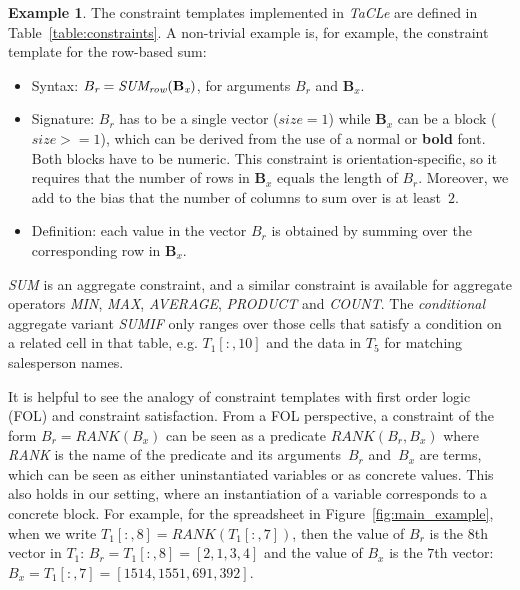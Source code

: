 \documentclass{IEEEtran}
\newcommand{\format}[1]{\textit{#1}\xspace}
\newcommand{\sname}{\format{TaCLe}}
\newcommand{\CName}{Syntax\xspace}
\newcommand{\CSignature}{Signature\xspace}
\newcommand{\CFunction}{Definition\xspace}
\newcommand{\range}[3]{\ensuremath{#1[#2,#3]}}
\newcommand{\rangeall}{:}
\newcommand{\eccalc}[2]{\ensuremath{#1 = #2}}
\newcommand{\ecrank}[2]{\eccalc{#1}{\textit{RANK}(#2)}}
\newcommand{\ecsumr}[2]{\eccalc{#1}{\textit{SUM\textsubscript{row}}(#2)}}
\newcommand{\sbs}{B}
\newcommand{\sbl}[1]{\ensuremath{\sbs_{\textit{#1}}}}
\newcommand{\bsbl}[1]{\ensuremath{\mathbf{\sbs_{\textit{#1}}}}}
\theoremstyle{definition}
\newtheorem{example}{Example}
\begin{document}
\begin{example}
The constraint templates implemented in \sname are defined in Table~\ref{table:constraints}.
A non-trivial example is, for example, the constraint template for the row-based sum:

\begin{itemize}
  \item \CName: $\ecsumr{\sbl{r}}{\bsbl{x}}$, for arguments $\sbl{r}$ and $\bsbl{x}$.
  
  \item \CSignature: $\sbl{r}$ has to be a single vector ($\textit{size}=1$) while $\bsbl{x}$ can be a block ($\textit{size}>=1$), which can be derived from the use of a normal or \textbf{bold} font.
  Both blocks have to be numeric.
  This constraint is orientation-specific, so it requires that the number of rows in $\bsbl{x}$ equals the length of $\sbl{r}$.
  Moreover, we add to the bias that the number of columns to sum over is at least~$2$.
  
  \item \CFunction: each value in the vector $\sbl{r}$ is obtained by summing over the corresponding row in $\bsbl{x}$.
\end{itemize}
\textit{SUM} is an aggregate constraint, and a similar constraint is available for aggregate operators \textit{MIN}, \textit{MAX}, \textit{AVERAGE}, \textit{PRODUCT} and \textit{COUNT}. The \textit{conditional} aggregate variant \textit{SUMIF} only ranges over those cells that satisfy a condition on a related cell in that table, e.g. $\range{T_1}{\rangeall}{10}$ and the data in $T_5$ for matching salesperson names.
\end{example}


It is helpful to see the analogy of constraint templates with first order logic (FOL) and constraint satisfaction.
From a FOL perspective, a constraint of the form $\ecrank{\sbl{r}}{\sbl{x}}$ can be seen as a predicate $\textit{RANK}(\sbl{r}, \sbl{x})$ where \textit{RANK} is the name of the predicate and its arguments~$\sbl{r}$ and~$\sbl{x}$ are terms, which can be seen as either uninstantiated variables or as concrete values.
This also holds in our setting, where an instantiation of a variable corresponds to a concrete block.
For example, for the spreadsheet in Figure~\ref{fig:main_example}, when we write $\ecrank{\range{T_1}{\rangeall}{8}}{\range{T_1}{\rangeall}{7}}$, then the value of $\sbl{r}$ is the $8$th vector in $T_1$: $\sbl{r} = \range{T_1}{\rangeall}{8} = [2,1,3,4]$ and the value of $\sbl{x}$ is the $7$th vector: $\sbl{x} = \range{T_1}{\rangeall}{7} = [1514, 1551, 691, 392]$.
\end{document}
